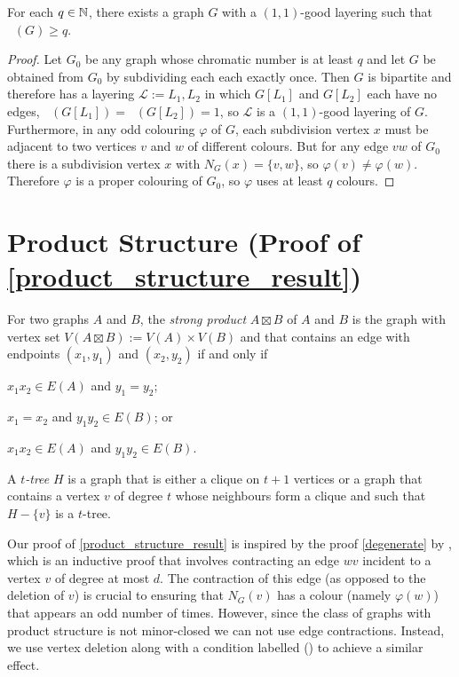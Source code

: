 \documentclass{patmorin}
\DeclareMathOperator{\odd}{\chi_o}
\begin{document}
\begin{obs}
  For each $q\in\mathbb{N}$, there exists a graph $G$ with a $(1,1)$-good layering such that $\odd(G)\ge q$.
\end{obs}

\begin{proof}
  Let $G_0$ be any graph whose chromatic number is at least $q$ and let $G$ be obtained from $G_0$ by subdividing each each exactly once.  Then $G$ is bipartite and therefore has a layering $\mathcal{L}:=L_1,L_2$ in which $G[L_1]$ and $G[L_2]$ each have no edges, $\odd(G[L_1])=\odd(G[L_2])=1$, so $\mathcal{L}$ is a $(1,1)$-good layering of $G$.  Furthermore, in any odd colouring $\varphi$ of $G$, each subdivision vertex $x$ must be adjacent to two vertices $v$ and $w$ of different colours.  But for any edge $vw$ of $G_0$ there is a subdivision vertex $x$ with $N_G(x)=\{v,w\}$, so $\varphi(v)\neq\varphi(w)$.  Therefore $\varphi$ is a proper colouring of $G_0$, so $\varphi$ uses at least $q$ colours.
\end{proof}

\section{Product Structure (Proof of \cref{product_structure_result})}
\label{product_structure}

For two graphs $A$ and $B$, the \emph{strong product} $A\boxtimes B$ of $A$ and $B$ is the graph with vertex set $V(A\boxtimes B):=V(A)\times V(B)$ and that contains an edge with endpoints $(x_1,y_1)$ and $(x_2,y_2)$ if and only if
\begin{inparaenum}[(i)]
  \item $x_1x_2\in E(A)$ and $y_1=y_2$;
  \item $x_1=x_2$ and $y_1y_2\in E(B)$; or
  \item $x_1x_2\in E(A)$ and $y_1y_2\in E(B)$.
\end{inparaenum}
A \emph{$t$-tree} $H$ is a graph that is either a clique on $t+1$ vertices or a graph that contains a vertex $v$ of degree $t$ whose neighbours form a clique and such that $H-\{v\}$ is a $t$-tree.

Our proof of \cref{product_structure_result} is inspired by the proof \cref{degenerate} by \citet{cranston.lafferty.ea:note}, which is an inductive proof that involves contracting an edge $wv$ incident to a vertex $v$ of degree at most $d$.  The contraction of this edge (as opposed to the deletion of $v$) is crucial to ensuring that $N_G(v)$ has a colour (namely $\varphi(w)$) that appears an odd number of times.  However, since the class of graphs with product structure is not minor-closed we can not use edge contractions. Instead, we use vertex deletion along with a condition labelled () to achieve a similar effect.
\end{document}
